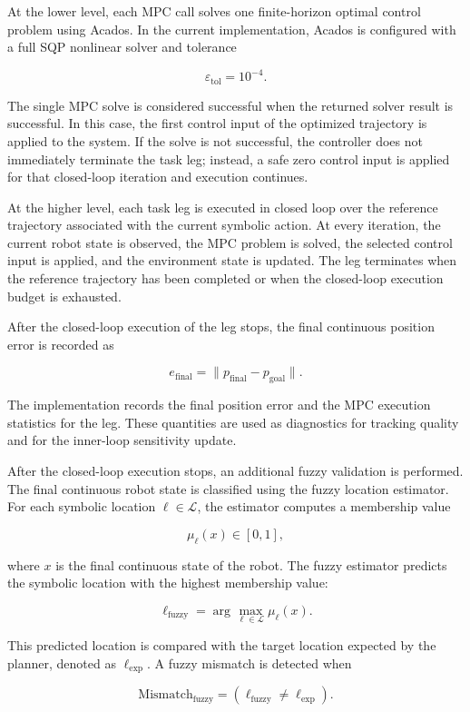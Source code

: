 \documentclass{article}
\begin{document}
At the lower level, each MPC call solves one finite-horizon optimal control problem using Acados. In the current implementation, Acados is configured with a full SQP nonlinear solver and tolerance

\[
\varepsilon_{\mathrm{tol}} = 10^{-4}.
\]

The single MPC solve is considered successful when the returned solver result is successful. In this case, the first control input of the optimized trajectory is applied to the system. If the solve is not successful, the controller does not immediately terminate the task leg; instead, a safe zero control input is applied for that closed-loop iteration and execution continues.

At the higher level, each task leg is executed in closed loop over the reference trajectory associated with the current symbolic action. At every iteration, the current robot state is observed, the MPC problem is solved, the selected control input is applied, and the environment state is updated. The leg terminates when the reference trajectory has been completed or when the closed-loop execution budget is exhausted.

After the closed-loop execution of the leg stops, the final continuous position error is recorded as

\[
e_{\mathrm{final}} = \|p_{\mathrm{final}} - p_{\mathrm{goal}}\|.
\]

The implementation records the final position error and the MPC execution statistics for the leg. These quantities are used as diagnostics for tracking quality and for the inner-loop sensitivity update.

After the closed-loop execution stops, an additional fuzzy validation is performed. The final continuous robot state is classified using the fuzzy location estimator. For each symbolic location \(\ell \in \mathcal{L}\), the estimator computes a membership value

\[
\mu_{\ell}(x) \in [0,1],
\]

where \(x\) is the final continuous state of the robot. The fuzzy estimator predicts the symbolic location with the highest membership value:

\[
\ell_{\mathrm{fuzzy}}
=
\arg\max_{\ell \in \mathcal{L}} \mu_{\ell}(x).
\]

This predicted location is compared with the target location expected by the planner, denoted as \(\ell_{\mathrm{exp}}\). A fuzzy mismatch is detected when

\[
\mathrm{Mismatch}_{\mathrm{fuzzy}}
=
\left(\ell_{\mathrm{fuzzy}} \neq \ell_{\mathrm{exp}}\right).
\]
\end{document}

